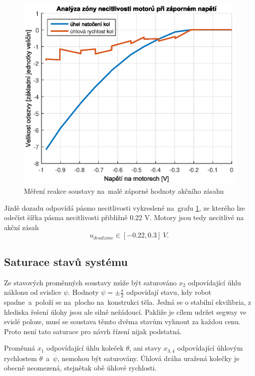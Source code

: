 \documentclass[conference]{IEEEtran}
\begin{document}
\begin{figure}[htbp]
    \centerline{\includegraphics[width=\linewidth]{deadzone_motory_vzad.eps}}
    \caption{Měření reakce soustavy na~malé záporné hodnoty akčního zásahu}
    \label{fig:deadzone_vzad}        
\end{figure}

Jízdě dozadu odpovídá pásmo necitlivosti vykreslené na~grafu \ref{fig:deadzone_vzad}, ze kterého
lze odečíst šířka pásma necitlivosti přibližně 0.22 \si{V}. Motory jsou tedy necitlivé
na akční zásah
\begin{equation}
    u_{deadzone} \in [-0.22, 0.3] ~\si{V}.
    \label{eq:deadzone}
\end{equation}

\subsection{Saturace stavů systému}

Ze stavových proměnných soustavy může být saturováno $x_2$ odpovídající úhlu náklonu od svislice $\psi$.
Hodnoty $\psi = \pm \frac{\pi}{2}$ odpovídají stavu, kdy robot spadne~a~položí se na~plocho na~konstrukci těla.
Jedná se o stabilní ekvilibria, z hlediska řešení úlohy jsou ale silně nežádoucí. Pakliže je cílem udržet segway ve svislé poloze,
musí se soustava těmto dvěma stavům vyhnout za každou cenu. Proto není tato saturace pro návrh řízení nijak podstatná.

Proměnná $x_1$ odpovídající úhlu koleček $\theta$, ani stavy $x_{3,4}$ odpovídající úhlovým rychlostem $\dot{\theta}$~a~$\dot{\psi}$,
nemohou být saturovány. Úhlová dráha uražená kolečky je obecně neomezená, stejnětak obě úhlové rychlosti.
\end{document}
